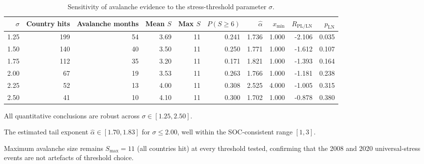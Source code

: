 \begin{table}[!htbp]
\centering
\footnotesize
\begin{threeparttable}
\caption{Sensitivity of avalanche evidence to the stress-threshold parameter $\sigma$.}
\label{tab:threshold_robustness}
\begin{tabular}{rrrrrrrrrr}
\toprule
$\sigma$ & Country hits & Avalanche months & Mean $S$ & Max $S$ & $P(S\geq 6)$ & $\hat{\alpha}$ & $x_{\min}$ & $R_{\mathrm{PL/LN}}$ & $p_{\mathrm{LN}}$ \\
\midrule
1.25 & 199 & 54 & 3.69 & 11 & 0.241 & 1.736 & 1.000 & -2.106 & 0.035 \\
1.50 & 140 & 40 & 3.50 & 11 & 0.250 & 1.771 & 1.000 & -1.612 & 0.107 \\
1.75 & 112 & 35 & 3.20 & 11 & 0.171 & 1.821 & 1.000 & -1.393 & 0.164 \\
2.00 & 67 & 19 & 3.53 & 11 & 0.263 & 1.766 & 1.000 & -1.181 & 0.238 \\
2.25 & 52 & 13 & 4.00 & 11 & 0.308 & 2.525 & 4.000 & -1.005 & 0.315 \\
2.50 & 41 & 10 & 4.10 & 11 & 0.300 & 1.702 & 1.000 & -0.878 & 0.380 \\
\bottomrule
\end{tabular}
\begin{tablenotes}\footnotesize
\item All quantitative conclusions are robust across $\sigma\in[1.25, 2.50]$.
\item The estimated tail exponent $\hat{\alpha}\in[1.70, 1.83]$ for $\sigma\leq 2.00$, well within the SOC-consistent range $[1,3]$.
\item Maximum avalanche size remains $S_{\max}=11$ (all countries hit) at every threshold tested, confirming that the 2008 and 2020 universal-stress events are not artefacts of threshold choice.
\end{tablenotes}
\end{threeparttable}
\end{table}

